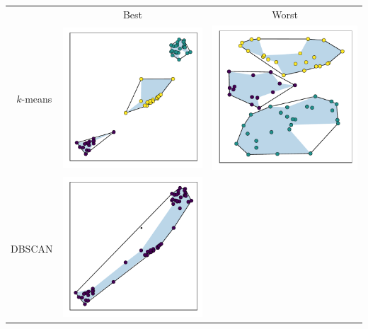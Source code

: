 \documentclass[a0paper]{betterposter}
\begin{document}
{\vspace{-1.5em}\begin{center}
    \begin{minipage}{.8\linewidth}
        \hspace{-1em}\begin{tabular}{ccc}
            {} & Best & Worst\\
            \begin{turn}{90}\qquad\ \(k\)-means\end{turn} &
            \includegraphics[width=.45\linewidth]{img/kmeans_best.pdf} &
            \includegraphics[width=.45\linewidth]{img/kmeans_worst.pdf}\\
            \begin{turn}{90}\qquad DBSCAN\end{turn} &
            \includegraphics[width=.45\linewidth]{img/dbscan_best.pdf} &

\end{tabular}
\end{minipage}
\end{center}}
\end{document}
